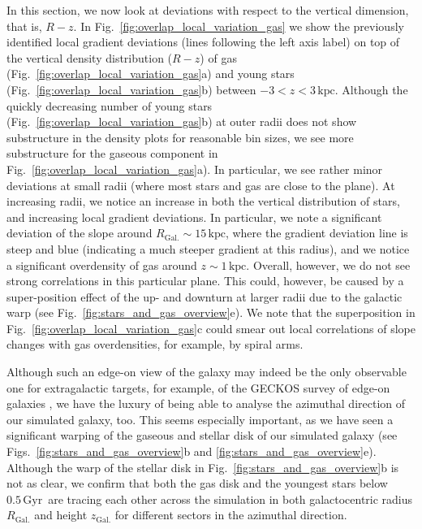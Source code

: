 \documentclass[fleqn,usenatbib]{mnras}
\newcommand{\nihaoAGEmax}{$0.5\,\mathrm{Gyr}$}
\begin{document}
In this section, we now look at deviations with respect to the vertical dimension, that is, $R-z$. In Fig.~\ref{fig:overlap_local_variation_gas} we show the previously identified local gradient deviations (lines following the left axis label) on top of the vertical density distribution ($R-z$) of gas (Fig.~\ref{fig:overlap_local_variation_gas}a) and young stars (Fig.~\ref{fig:overlap_local_variation_gas}b) between $-3 < z < 3\,\mathrm{kpc}$. Although the quickly decreasing number of young stars (Fig.~\ref{fig:overlap_local_variation_gas}b) at outer radii does not show substructure in the density plots for reasonable bin sizes, we see more substructure for the gaseous component in Fig.~\ref{fig:overlap_local_variation_gas}a). In particular, we see rather minor deviations at small radii (where most stars and gas are close to the plane). At increasing radii, we notice an increase in both the vertical distribution of stars, and increasing local gradient deviations. In particular, we note a significant deviation of the slope around $R_\mathrm{Gal.} \sim 15\,\mathrm{kpc}$, where the gradient deviation line is steep and blue (indicating a much steeper gradient at this radius), and we notice a significant overdensity of gas around $z \sim 1\,\mathrm{kpc}$. Overall, however, we do not see strong correlations in this particular plane. This could, however, be caused by a super-position effect of the up- and downturn at larger radii due to the galactic warp (see Fig.~\ref{fig:stars_and_gas_overview}e). We note that the superposition in Fig.~\ref{fig:overlap_local_variation_gas}c could smear out local correlations of slope changes with gas overdensities, for example, by spiral arms.

Although such an edge-on view of the galaxy may indeed be the only observable one for extragalactic targets, for example, of the GECKOS survey of edge-on galaxies \citep{GECKOS2023}, we have the luxury of being able to analyse the azimuthal direction of our simulated galaxy, too. This seems especially important, as we have seen a significant warping of the gaseous and stellar disk of our simulated galaxy (see Figs.~\ref{fig:stars_and_gas_overview}b and \ref{fig:stars_and_gas_overview}e). Although the warp of the stellar disk in Fig.~\ref{fig:stars_and_gas_overview}b is not as clear, we confirm that both the gas disk and the youngest stars below \nihaoAGEmax\ are tracing each other across the simulation in both galactocentric radius $R_\mathrm{Gal.}$ and height $z_\mathrm{Gal.}$ for different sectors in the azimuthal direction.
\end{document}

